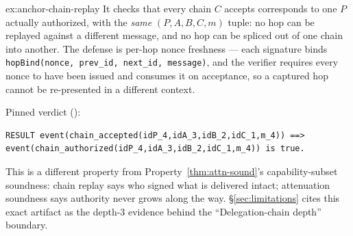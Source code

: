 \documentclass[11pt,a4paper]{article}
\theoremstyle{definition}
\begin{document}
\begin{pdsolution}{ex:anchor-chain-replay}
It checks that every chain $C$ accepts corresponds to one $P$ actually authorized, with the \emph{same} $(P,A,B,C,m)$ tuple: no hop can be replayed against a different message, and no hop can be spliced out of one chain into another. The defense is per-hop nonce freshness --- each signature binds \texttt{hopBind(nonce, prev\_id, next\_id, message)}, and the verifier requires every nonce to have been issued and consumes it on acceptance, so a captured hop cannot be re-presented in a different context.

Pinned verdict ():
\begin{lstlisting}
RESULT event(chain_accepted(idP_4,idA_3,idB_2,idC_1,m_4)) ==> event(chain_authorized(idP_4,idA_3,idB_2,idC_1,m_4)) is true.
\end{lstlisting}
This is a different property from Property~\ref{thm:attn-sound}'s capability-subset soundness: chain replay says who signed what is delivered intact; attenuation soundness says authority never grows along the way. \S\ref{sec:limitations} cites this exact artifact as the depth-3 evidence behind the ``Delegation-chain depth'' boundary.
\end{pdsolution}

\end{document}
